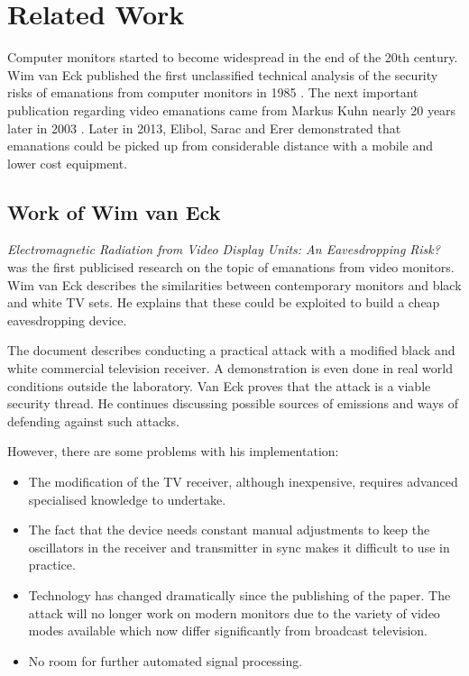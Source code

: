 \documentclass[a4paper,12pt,twoside,openright]{report}
\begin{document}
\section{Related Work}
\label{sec:RelatedWork}

Computer monitors started to become widespread in the end of the 20th century. Wim van Eck published the first unclassified technical analysis of the security risks of emanations from computer monitors in 1985 \cite{van1985electromagnetic}. The next important publication regarding video emanations came from Markus Kuhn nearly 20 years later in 2003 \cite{kuhn2003compromising}. Later in 2013, Elibol, Sarac and Erer demonstrated that emanations could be picked up from considerable distance with a mobile and lower cost equipment.

\subsection{Work of Wim van Eck}

\textit{Electromagnetic Radiation from Video Display Units: An Eavesdropping Risk?} \cite{van1985electromagnetic} was the first publicised research on the topic of emanations from video monitors. Wim van Eck describes the similarities between contemporary monitors and black and white TV sets. He explains that these could be exploited to build a cheap eavesdropping device.

The document describes conducting a practical attack with a modified black and white commercial television receiver. A demonstration is even done in real world conditions outside the laboratory. Van Eck proves that the attack is a viable security thread. He continues discussing possible sources of emissions and ways of defending against such attacks.

However, there are some problems with his implementation:

\begin{itemize}

  \item The modification of the TV receiver, although inexpensive, requires advanced specialised knowledge to undertake.
  \item The fact that the device needs constant manual adjustments to keep the oscillators in the receiver and transmitter in sync makes it difficult to use in practice.
  \item Technology has changed dramatically since the publishing of the paper. The attack will no longer work on modern monitors due to the variety of video modes available which now differ significantly from broadcast television. 
  \item No room for further automated signal processing.

\end{itemize}
\end{document}
